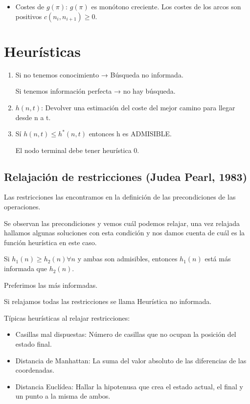 \documentclass[12pt, twoside, openright]{report} %
\begin{document}
\begin{itemize}
	\item Costes de \(g(\pi)\): \(g(\pi)\) es monótono creciente. Los costes
	      de los arcos son positivos \(c(n_i,n_{i+1}) \geq 0\).
\end{itemize}


\section{Heurísticas}

\begin{enumerate}
	\def\labelenumi{\arabic{enumi}.}
	\item Si no tenemos conocimiento → Búsqueda no informada.

	      Si tenemos información perfecta → no hay búsqueda.
	\item \(h(n,t)\): Devolver una estimación del coste del mejor camino para
	      llegar desde n a t.
	\item Sí \(h(n,t) \leq h^*(n,t)\) entonces h es ADMISIBLE.

	      El nodo terminal debe tener heurística 0.
\end{enumerate}

\subsection{Relajación de restricciones (Judea Pearl, 1983)}



Las restricciones las encontramos en la definición de las
precondiciones de las operaciones.

Se observan las precondiciones y vemos cuál podemos relajar, una vez
relajada hallamos algunas soluciones con esta condición y nos damos
cuenta de cuál es la función heurística en este caso.

Si \(h_1(n)\geq h_2(n) \forall n\) y ambas son admisibles, entonces
\(h_1(n)\) está más informada que \(h_2(n)\).

Preferimos las más informadas.

Si relajamos todas las restricciones se llama Heurística no
informada.

Típicas heurísticas al relajar restricciones:

\begin{itemize}
	\item Casillas mal dispuestas: Número de casillas que no ocupan la
	      posición del estado final.
	\item Distancia de Manhattan: La suma del valor absoluto de las
	      diferencias de las coordenadas.
	\item Distancia Euclídea: Hallar la hipotenusa que crea el estado
	      actual, el final y un punto a la misma de ambos.
\end{itemize}
\pagebreak
\end{document}
